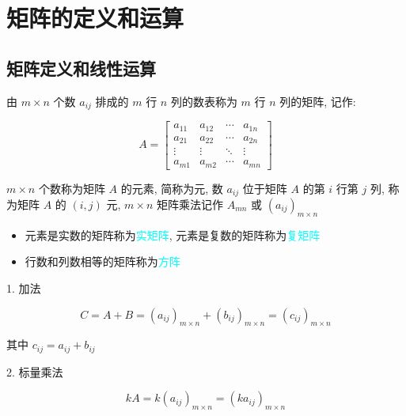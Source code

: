 \section{矩阵的定义和运算}
\subsection{矩阵定义和线性运算}
\begin{definition}[矩阵定义]
	由 $m\times n$ 个数 $a_{ij}$ 排成的 $m$ 行 $n$ 列的数表称为 $m$ 行 $n$ 列的矩阵, 记作:
	
	$$A = \begin{bmatrix}
		a_{11} & a_{12} & \cdots & a_{1n}\\
		a_{21} & a_{22} & \cdots & a_{2n}\\
		\vdots & \vdots & \ddots & \vdots\\
		a_{m1} & a_{m2} & \cdots & a_{mn}
	\end{bmatrix}$$

	$m\times n$ 个数称为矩阵 $A$ 的元素, 简称为元, 数 $a_{ij}$ 位于矩阵 $A$ 的第 $i$ 行第 $j$ 列, 称为矩阵 $A$ 的 $(i,j)$ 元, 
	$m\times n$ 矩阵乘法记作 $A_{mn}$ 或 $(a_{ij})_{m\times n}$
	\begin{itemize}
		\item  元素是实数的矩阵称为\textcolor{cyan}{实矩阵}, 元素是复数的矩阵称为\textcolor{cyan}{复矩阵}
		\item  行数和列数相等的矩阵称为\textcolor{cyan}{方阵}
	\end{itemize}
\end{definition}

\begin{definition}[矩阵的线性运算]
	\textcolor{purpleb}{1. 加法}

	$$C=A + B=(a_{ij})_{m\times n} + (b_{ij})_{m\times n}=(c_{ij})_{m\times n}$$
	
	其中 $c_{ij}=a_{ij} + b_{ij}$

	\textcolor{purpleb}{2. 标量乘法}

	$$kA=k(a_{ij})_{m\times n}=(ka_{ij})_{m\times n}$$
\end{definition}


